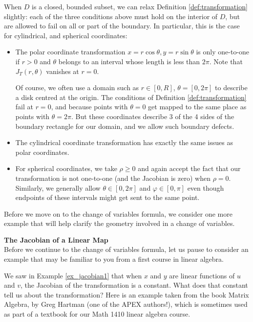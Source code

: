 When $D$ is a closed, bounded subset, we can relax Definition \ref{def:transformation} slightly: each of the three conditions above must hold on the interior of $D$, but are allowed to fail on all or part of the boundary. In particular, this is the case for cylindrical, and spherical coordinates:
\begin{itemize}
\item The polar coordinate transformation $x=r\cos\theta, y=r\sin\theta$ is only one-to-one if $r>0$ and $\theta$ belongs to an interval whose length is less than $2\pi$. Note that $J_T(r,\theta)$ vanishes at $r=0$.

Of course, we often use a domain such as $r\in [0,R]$, $\theta = [0,2\pi]$ to describe a disk centred at the origin. The conditions of Definition \ref{def:transformation} fail at $r=0$, and because points with $\theta=0$ get mapped to the same place as points with $\theta = 2\pi$. But these coordinates describe 3 of the 4 sides of the boundary rectangle for our domain, and we allow such boundary defects.

\item The cylindrical coordinate transformation has exactly the same issues as polar coordinates.

\item For spherical coordinates, we take $\rho\geq 0$ and again accept the fact that our transformation is not one-to-one (and the Jacobian is zero) when $\rho=0$. Similarly, we generally allow $\theta\in [0,2\pi]$ and $\varphi\in [0,\pi]$ even though endpoints of these intervals might get sent to the same point.
\end{itemize}


Before we move on to the change of variables formula, we consider one more example that will help clarify the geometry involved in a change of variables.

\pagebreak
\noindent\textbf{\large The Jacobian of a Linear Map}\\

Before we continue to the change of variables formula, let us pause to consider an example that may be familiar to you from a first course in linear algebra.

We saw in Example \ref{ex_jacobian1} that when $x$ and $y$ are linear functions of $u$ and $v$, the Jacobian of the transformation is a constant. What does that constant tell us about the transformation? Here is an example taken from the book Matrix Algebra, by Greg Hartman (one of the APEX authors!), which is sometimes used as part of a textbook for our Math 1410 linear algebra course.

